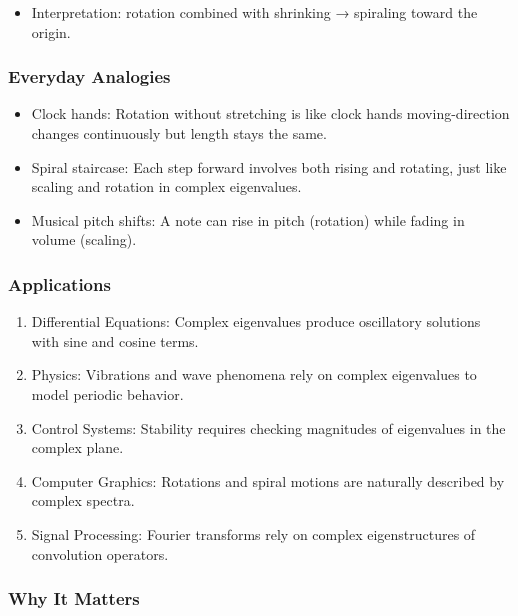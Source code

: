 \documentclass[
  letterpaper,
  DIV=11,
  numbers=noendperiod]{scrreprt}
\providecommand{\tightlist}{%
  \setlength{\itemsep}{0pt}\setlength{\parskip}{0pt}}
\begin{document}
\begin{itemize}
\tightlist
\item
  Interpretation: rotation combined with shrinking → spiraling toward
  the origin.
\end{itemize}

\subsubsection{Everyday Analogies}\label{everyday-analogies-62}

\begin{itemize}
\tightlist
\item
  Clock hands: Rotation without stretching is like clock hands
  moving-direction changes continuously but length stays the same.
\item
  Spiral staircase: Each step forward involves both rising and rotating,
  just like scaling and rotation in complex eigenvalues.
\item
  Musical pitch shifts: A note can rise in pitch (rotation) while fading
  in volume (scaling).
\end{itemize}

\subsubsection{Applications}\label{applications-28}

\begin{enumerate}
\def\labelenumi{\arabic{enumi}.}
\tightlist
\item
  Differential Equations: Complex eigenvalues produce oscillatory
  solutions with sine and cosine terms.
\item
  Physics: Vibrations and wave phenomena rely on complex eigenvalues to
  model periodic behavior.
\item
  Control Systems: Stability requires checking magnitudes of eigenvalues
  in the complex plane.
\item
  Computer Graphics: Rotations and spiral motions are naturally
  described by complex spectra.
\item
  Signal Processing: Fourier transforms rely on complex eigenstructures
  of convolution operators.
\end{enumerate}

\subsubsection{Why It Matters}\label{why-it-matters-62}
\end{document}
